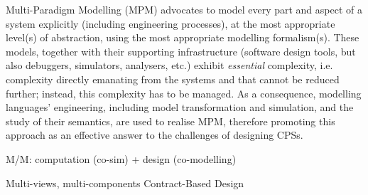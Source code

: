 Multi-Paradigm Modelling (MPM) advocates to model every part and aspect of a system
explicitly (including engineering processes), at the most appropriate level(s) 
of abstraction, using the most appropriate modelling formalism(s). These models,
together with their supporting infrastructure (software design tools, but also
debuggers, simulators, analysers, etc.) exhibit \emph{essential} complexity, i.e.
complexity directly emanating from the systems and that cannot be reduced further;
instead, this complexity has to be managed. As a consequence, modelling languages'
engineering, including model transformation and simulation, and the study of their
semantics, are used to realise MPM, therefore promoting this approach as an 
effective answer to the challenges of designing CPSs.


M/M: computation (co-sim) + design (co-modelling)

Multi-views, multi-components
Contract-Based Design


